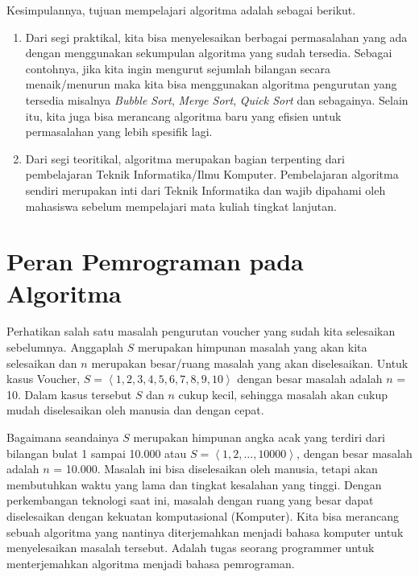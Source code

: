 
Kesimpulannya, tujuan mempelajari algoritma adalah sebagai berikut.
\begin{enumerate}
	\item Dari segi praktikal, kita bisa menyelesaikan berbagai permasalahan yang ada dengan menggunakan sekumpulan algoritma yang sudah tersedia. Sebagai contohnya, jika kita ingin mengurut sejumlah bilangan secara menaik/menurun maka kita bisa menggunakan algoritma pengurutan yang tersedia misalnya \textit{Bubble Sort}, \textit{Merge Sort}, \textit{Quick Sort} dan sebagainya. Selain itu, kita juga bisa merancang algoritma baru yang efisien untuk permasalahan yang lebih spesifik lagi.
	\item Dari segi teoritikal, algoritma merupakan bagian terpenting dari pembelajaran Teknik Informatika/Ilmu Komputer. Pembelajaran algoritma sendiri merupakan inti dari Teknik Informatika dan wajib dipahami oleh mahasiswa sebelum mempelajari mata kuliah tingkat lanjutan.
\end{enumerate}


\section{Peran Pemrograman pada Algoritma}

Perhatikan salah satu masalah pengurutan voucher yang sudah kita selesaikan sebelumnya. Anggaplah $S$ merupakan himpunan masalah yang akan kita selesaikan dan $n$ merupakan besar/ruang masalah yang akan diselesaikan.  Untuk kasus Voucher, $S = \left\langle1,2,3,4,5,6,7,8,9,10\right\rangle$ dengan besar masalah adalah $n$ = 10. Dalam kasus tersebut $S$ dan $n$ cukup kecil, sehingga masalah akan cukup mudah diselesaikan oleh manusia dan dengan cepat.

Bagaimana seandainya $S$ merupakan himpunan angka acak yang terdiri dari bilangan bulat 1 sampai 10.000 atau $S = \left\langle1,2, ..., 10000\right\rangle$, dengan besar masalah adalah $n$ = 10.000. Masalah ini bisa diselesaikan oleh manusia, tetapi akan membutuhkan waktu yang lama dan tingkat kesalahan yang tinggi. Dengan perkembangan teknologi saat ini, masalah dengan ruang yang besar dapat diselesaikan dengan kekuatan komputasional (Komputer). Kita bisa merancang sebuah algoritma yang nantinya diterjemahkan menjadi bahasa komputer untuk menyelesaikan masalah tersebut. Adalah tugas seorang programmer untuk menterjemahkan algoritma menjadi bahasa pemrograman.

